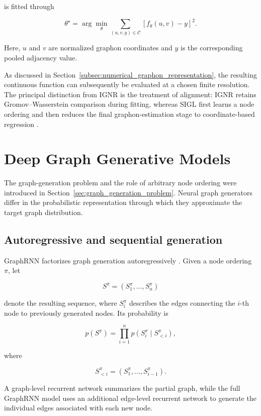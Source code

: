 is fitted through

\[
\theta^\star
=
\arg\min_{\theta}
\sum_{(u,v,y)\in\mathcal{C}}
\left[
f_\theta(u,v)-y
\right]^2.
\]

Here, \(u\) and \(v\) are normalized graphon coordinates and \(y\) is the corresponding pooled adjacency value.

As discussed in Section~\ref{subsec:numerical_graphon_representation}, the resulting continuous function can subsequently be evaluated at a chosen finite resolution. The principal distinction from IGNR is the treatment of alignment: IGNR retains Gromov--Wasserstein comparison during fitting, whereas SIGL first learns a node ordering and then reduces the final graphon-estimation stage to coordinate-based regression \cite{xia2023implicit,azizpour2025scalable}.


\section{Deep Graph Generative Models}
\label{sec:rw_graph_generation}

The graph-generation problem and the role of arbitrary node ordering were introduced in Section~\ref{sec:graph_generation_problem}. Neural graph generators differ in the probabilistic representation through which they approximate the target graph distribution.


\subsection{Autoregressive and sequential generation}
\label{subsec:rw_autoregressive_generation}

GraphRNN factorizes graph generation autoregressively \cite{you2018graphrnn}. Given a node ordering \(\pi\), let

\[
S^\pi
=
\left(
S^\pi_1,\ldots,S^\pi_n
\right)
\]

denote the resulting sequence, where \(S^\pi_i\) describes the edges connecting the \(i\)-th node to previously generated nodes. Its probability is

\[
p(S^\pi)
=
\prod_{i=1}^{n}
p
\left(
S^\pi_i
\mid
S^\pi_{<i}
\right),
\]

where

\[
S^\pi_{<i}
=
(S^\pi_1,\ldots,S^\pi_{i-1}).
\]

A graph-level recurrent network summarizes the partial graph, while the full GraphRNN model uses an additional edge-level recurrent network to generate the individual edges associated with each new node.

